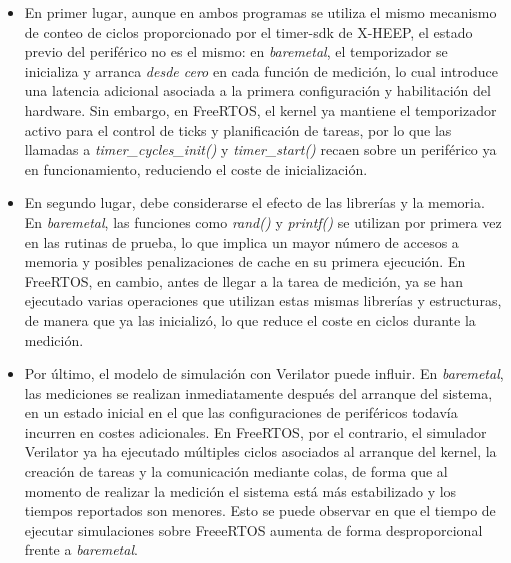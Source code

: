 \begin{itemize}
    \item En primer lugar, aunque en ambos programas se utiliza el mismo mecanismo de conteo de ciclos proporcionado por el timer-sdk de X-HEEP, el estado previo del periférico no es el mismo: en \textit{baremetal}, el temporizador se inicializa y arranca \emph{desde cero} en cada función de medición, lo cual introduce una latencia adicional asociada a la primera configuración y habilitación del hardware. Sin embargo, en FreeRTOS, el kernel ya mantiene el temporizador activo para el control de ticks y planificación de tareas, por lo que las llamadas a \emph{timer\_cycles\_init()} y \emph{timer\_start()} recaen sobre un periférico ya en funcionamiento, reduciendo el coste de inicialización.

    \item En segundo lugar, debe considerarse el efecto de las librerías y la memoria. En \textit{baremetal}, las funciones como \emph{rand()} y \emph{printf()} se utilizan por primera vez en las rutinas de prueba, lo que implica un mayor número de accesos a memoria y posibles penalizaciones de cache en su primera ejecución. En FreeRTOS, en cambio, antes de llegar a la tarea de medición, ya se han ejecutado varias operaciones que utilizan estas mismas librerías y estructuras, de manera que ya las inicializó, lo que reduce el coste en ciclos durante la medición.

    \item Por último, el modelo de simulación con Verilator puede influir. En \textit{baremetal}, las mediciones se realizan inmediatamente después del arranque del sistema, en un estado inicial en el que las configuraciones de periféricos todavía incurren en costes adicionales. En FreeRTOS, por el contrario, el simulador Verilator ya ha ejecutado múltiples ciclos asociados al arranque del kernel, la creación de tareas y la comunicación mediante colas, de forma que al momento de realizar la medición el sistema está más estabilizado y los tiempos reportados son menores. Esto se puede observar en que el tiempo de ejecutar simulaciones sobre FreeeRTOS aumenta de forma desproporcional frente a \textit{baremetal}.
\end{itemize}
